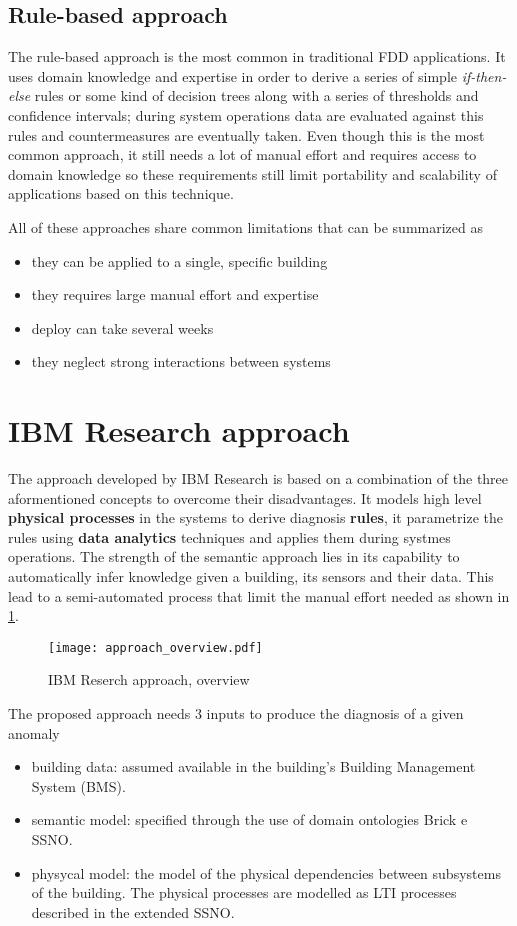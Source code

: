 \subsection{Rule-based approach} \label{subsec:rule_models}
The rule-based approach is the most common in traditional FDD applications. It uses domain knowledge and expertise in order to derive a series of simple \textit{if-then-else} rules or some kind of decision trees along with a series of thresholds and confidence intervals; during system operations data are evaluated against this rules and countermeasures are eventually taken. Even though this is the most common approach, it still needs a lot of manual effort and requires access to domain knowledge so these requirements still limit portability and scalability of applications based on this technique.

All of these approaches share common limitations that can be summarized as
\begin{itemize}
  \item they can be applied to a single, specific building
  \item they requires large manual effort and expertise
  \item deploy can take several weeks
  \item they neglect strong interactions between systems
\end{itemize}

\section{IBM Research approach}
The approach developed by IBM Research is based on a combination of the three aformentioned concepts to overcome their disadvantages. It models high level \textbf{physical processes} in the systems to derive diagnosis \textbf{rules}, it parametrize the rules using \textbf{data analytics} techniques and applies them during systmes operations. The strength of the semantic approach lies in its capability to automatically infer knowledge given a building, its sensors and their data. This lead to a semi-automated process that limit the manual effort needed as shown in \ref{fig:approach_overview}.

\begin{figure}
  \centering
  \texttt{[image: approach\_overview.pdf]}
  \caption{IBM Reserch approach, overview}
  \label{fig:approach_overview}
\end{figure}

The proposed approach needs 3 inputs to produce the diagnosis of a given anomaly
\begin{itemize}
  \item building data: assumed available in the building's Building Management System (BMS).
  \item semantic model: specified through the use of domain ontologies Brick e SSNO.
  \item physycal model: the model of the physical dependencies between subsystems of the building. The physical processes are modelled as LTI processes described in the extended SSNO.
\end{itemize}
